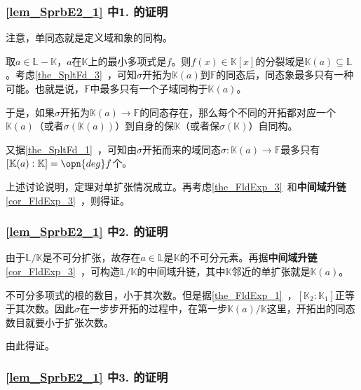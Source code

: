 \subsubsection{\autoref{lem_SprbE2_1} 中1. 的证明}



注意，单同态就是定义域和象的同构。

取$a\in\mathbb{L}-\mathbb{K}$，$a$在$\mathbb{K}$上的最小多项式是$f$。则$f(x)\in\mathbb{K}[x]$的分裂域是$\mathbb{K}(a)\subseteq\mathbb{L}$。考虑\autoref{the_SpltFd_3}~，可知$\sigma$开拓为$\mathbb{K}(a)$到$\mathbb{F}$的同态后，同态象最多只有一种可能。也就是说，$\mathbb{F}$中最多只有一个子域同构于$\mathbb{K}(a)$。

于是，如果$\sigma$开拓为$\mathbb{K}(a)\to\mathbb{F}$的同态存在，那么每个不同的开拓都对应一个$\mathbb{K}(a)$（或者$\sigma(\mathbb{K}(a))$）到自身的保$\mathbb{K}$（或者保$\sigma(\mathbb{K})$）自同构。

又据\autoref{the_SpltFd_1}~，可知由$\sigma$开拓而来的域同态$\sigma:\mathbb{K}(a)\to\mathbb{F}$最多只有$[\mathbb{K}(a):\mathbb{K}]=\opn{deg}f$个。

上述讨论说明，定理对单扩张情况成立。再考虑\autoref{the_FldExp_3}~和\textbf{中间域升链}\autoref{cor_FldExp_3}~，则得证。



\subsubsection{\autoref{lem_SprbE2_1} 中2. 的证明}

由于$\mathbb{L}/\mathbb{K}$是不可分扩张，故存在$a\in\mathbb{L}$是$\mathbb{K}$的不可分元素。再据\textbf{中间域升链}\autoref{cor_FldExp_3}~，可构造$\mathbb{L}/\mathbb{K}$的中间域升链，其中$\mathbb{K}$邻近的单扩张就是$\mathbb{K}(a)$。

不可分多项式的根的数目，小于其次数。但是据\autoref{the_FldExp_1}~，$[\mathbb{K}_2:\mathbb{K}_1]$正等于其次数。因此$\sigma$在一步步开拓的过程中，在第一步$\mathbb{K}(a)/\mathbb{K}$这里，开拓出的同态数目就要小于扩张次数。

由此得证。


\subsubsection{\autoref{lem_SprbE2_1} 中3. 的证明}

